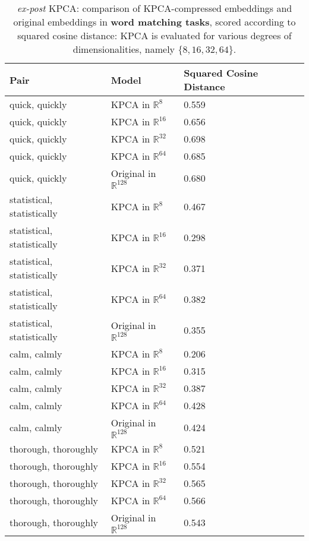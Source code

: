 \begin{table}[h]

\centering

\begin{tabular}{|l|l|l|}
\hline
\rowcolor[HTML]{C0C0C0} 
\textbf{Pair}  & \textbf{Model} & \textbf{Squared Cosine Distance} \\ \hline
quick, quickly & KPCA in $\mathbb{R}^{8}$       & 0.559  \\ \hline
quick, quickly & KPCA in $\mathbb{R}^{16}$      & 0.656  \\ \hline
quick, quickly &  KPCA in $\mathbb{R}^{32}$     & 0.698  \\ \hline
quick, quickly &  KPCA in $\mathbb{R}^{64}$     &  0.685 \\ \hline
quick, quickly & Original in $\mathbb{R}^{128}$ &  0.680 \\ \hline
statistical, statistically & KPCA in $\mathbb{R}^{8}$       & 0.467   \\ \hline
statistical, statistically & KPCA in $\mathbb{R}^{16}$      & 0.298  \\ \hline
statistical, statistically &  KPCA in $\mathbb{R}^{32}$     & 0.371  \\ \hline
statistical, statistically &  KPCA in $\mathbb{R}^{64}$     & 0.382   \\ \hline
statistical, statistically & Original in $\mathbb{R}^{128}$ & 0.355  \\ \hline
calm, calmly & KPCA in $\mathbb{R}^{8}$       & 0.206  \\ \hline
calm, calmly & KPCA in $\mathbb{R}^{16}$      & 0.315   \\ \hline
calm, calmly &  KPCA in $\mathbb{R}^{32}$     & 0.387  \\ \hline
calm, calmly &  KPCA in $\mathbb{R}^{64}$     & 0.428  \\ \hline
calm, calmly & Original in $\mathbb{R}^{128}$ & 0.424  \\ \hline
thorough, thoroughly & KPCA in $\mathbb{R}^{8}$       & 0.521   \\ \hline
thorough, thoroughly & KPCA in $\mathbb{R}^{16}$      & 0.554   \\ \hline
thorough, thoroughly &  KPCA in $\mathbb{R}^{32}$     & 0.565  \\ \hline
thorough, thoroughly &  KPCA in $\mathbb{R}^{64}$     & 0.566   \\ \hline
thorough, thoroughly & Original in $\mathbb{R}^{128}$ & 0.543  \\ \hline

\end{tabular}
\caption{\textit{ex-post} KPCA: comparison of KPCA-compressed embeddings and original embeddings in \textbf{word matching tasks},  scored according to squared cosine distance: KPCA is evaluated for various degrees of dimensionalities, namely $\{8,16,32,64\}$.}
\label{table:synmatch-post}
\end{table}


